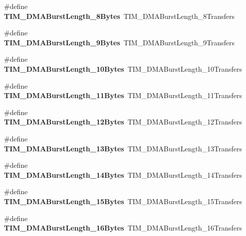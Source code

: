 \begin{DoxyCompactItemize}
\item 
\hypertarget{group__TIM__Legacy_gab7c002a9f06f7c238e15a0c61f047062}{
\#define {\bfseries TIM\_\-DMABurstLength\_\-8Bytes}~TIM\_\-DMABurstLength\_\-8Transfers}
\label{group__TIM__Legacy_gab7c002a9f06f7c238e15a0c61f047062}

\item 
\hypertarget{group__TIM__Legacy_ga2868d400329e705b89c1e425c9cb4fed}{
\#define {\bfseries TIM\_\-DMABurstLength\_\-9Bytes}~TIM\_\-DMABurstLength\_\-9Transfers}
\label{group__TIM__Legacy_ga2868d400329e705b89c1e425c9cb4fed}

\item 
\hypertarget{group__TIM__Legacy_ga99141ca3210700d07d098d161b42cdf3}{
\#define {\bfseries TIM\_\-DMABurstLength\_\-10Bytes}~TIM\_\-DMABurstLength\_\-10Transfers}
\label{group__TIM__Legacy_ga99141ca3210700d07d098d161b42cdf3}

\item 
\hypertarget{group__TIM__Legacy_ga1a4ab1c8a8469f0d28aafb902615f6db}{
\#define {\bfseries TIM\_\-DMABurstLength\_\-11Bytes}~TIM\_\-DMABurstLength\_\-11Transfers}
\label{group__TIM__Legacy_ga1a4ab1c8a8469f0d28aafb902615f6db}

\item 
\hypertarget{group__TIM__Legacy_ga41a8cee7ca5e9035a04c0920ab0f3f66}{
\#define {\bfseries TIM\_\-DMABurstLength\_\-12Bytes}~TIM\_\-DMABurstLength\_\-12Transfers}
\label{group__TIM__Legacy_ga41a8cee7ca5e9035a04c0920ab0f3f66}

\item 
\hypertarget{group__TIM__Legacy_ga79a0397f1c33cc2d0a8b5bdd94eca845}{
\#define {\bfseries TIM\_\-DMABurstLength\_\-13Bytes}~TIM\_\-DMABurstLength\_\-13Transfers}
\label{group__TIM__Legacy_ga79a0397f1c33cc2d0a8b5bdd94eca845}

\item 
\hypertarget{group__TIM__Legacy_gae1e210b9c3609e854e05c3594aa01c01}{
\#define {\bfseries TIM\_\-DMABurstLength\_\-14Bytes}~TIM\_\-DMABurstLength\_\-14Transfers}
\label{group__TIM__Legacy_gae1e210b9c3609e854e05c3594aa01c01}

\item 
\hypertarget{group__TIM__Legacy_ga3ca90d9fa3c80590175ba42baac57098}{
\#define {\bfseries TIM\_\-DMABurstLength\_\-15Bytes}~TIM\_\-DMABurstLength\_\-15Transfers}
\label{group__TIM__Legacy_ga3ca90d9fa3c80590175ba42baac57098}

\item 
\hypertarget{group__TIM__Legacy_ga672117a7dafcd778fe8e86db423b07e9}{
\#define {\bfseries TIM\_\-DMABurstLength\_\-16Bytes}~TIM\_\-DMABurstLength\_\-16Transfers}
\label{group__TIM__Legacy_ga672117a7dafcd778fe8e86db423b07e9}


\end{DoxyCompactItemize}
